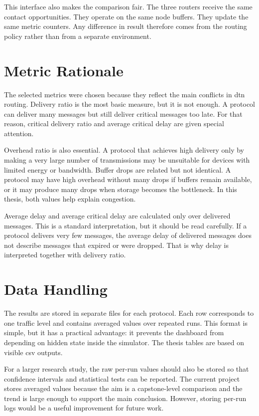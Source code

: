 This interface also makes the comparison fair. The three routers receive the same contact opportunities. They operate on the same node buffers. They update the same metric counters. Any difference in result therefore comes from the routing policy rather than from a separate environment.

\section{Metric Rationale}
The selected metrics were chosen because they reflect the main conflicts in \ac{dtn} routing. Delivery ratio is the most basic measure, but it is not enough. A protocol can deliver many messages but still deliver critical messages too late. For that reason, critical delivery ratio and average critical delay are given special attention.

Overhead ratio is also essential. A protocol that achieves high delivery only by making a very large number of transmissions may be unsuitable for devices with limited energy or bandwidth. Buffer drops are related but not identical. A protocol may have high overhead without many drops if buffers remain available, or it may produce many drops when storage becomes the bottleneck. In this thesis, both values help explain congestion.

Average delay and average critical delay are calculated only over delivered messages. This is a standard interpretation, but it should be read carefully. If a protocol delivers very few messages, the average delay of delivered messages does not describe messages that expired or were dropped. That is why delay is interpreted together with delivery ratio.

\section{Data Handling}
The results are stored in separate files for each protocol. Each row corresponds to one traffic level and contains averaged values over repeated runs. This format is simple, but it has a practical advantage: it prevents the dashboard from depending on hidden state inside the simulator. The thesis tables are based on visible \ac{csv} outputs.

For a larger research study, the raw per-run values should also be stored so that confidence intervals and statistical tests can be reported. The current project stores averaged values because the aim is a capstone-level comparison and the trend is large enough to support the main conclusion. However, storing per-run logs would be a useful improvement for future work.

